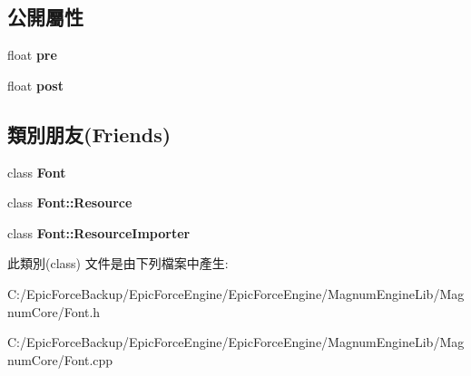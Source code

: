 \subsection*{公開屬性}
\begin{DoxyCompactItemize}
\item 
float {\bfseries pre}\hypertarget{class_magnum_1_1_font_1_1_quad_a71c6b4eb4f18a3c85398266227ae50bc}{}\label{class_magnum_1_1_font_1_1_quad_a71c6b4eb4f18a3c85398266227ae50bc}

\item 
float {\bfseries post}\hypertarget{class_magnum_1_1_font_1_1_quad_ab8ad6de2834a038e9e1c5c67e68adb4b}{}\label{class_magnum_1_1_font_1_1_quad_ab8ad6de2834a038e9e1c5c67e68adb4b}

\end{DoxyCompactItemize}
\subsection*{類別朋友(Friends)}
\begin{DoxyCompactItemize}
\item 
class {\bfseries Font}\hypertarget{class_magnum_1_1_font_1_1_quad_ad564b94b59dc295de3dfc4415d95cca8}{}\label{class_magnum_1_1_font_1_1_quad_ad564b94b59dc295de3dfc4415d95cca8}

\item 
class {\bfseries Font\+::\+Resource}\hypertarget{class_magnum_1_1_font_1_1_quad_aed1576435da2fd6be67b0972d456c130}{}\label{class_magnum_1_1_font_1_1_quad_aed1576435da2fd6be67b0972d456c130}

\item 
class {\bfseries Font\+::\+Resource\+Importer}\hypertarget{class_magnum_1_1_font_1_1_quad_adcf31f02b1c16e69102f4d80f9a06dfd}{}\label{class_magnum_1_1_font_1_1_quad_adcf31f02b1c16e69102f4d80f9a06dfd}

\end{DoxyCompactItemize}


此類別(class) 文件是由下列檔案中產生\+:\begin{DoxyCompactItemize}
\item 
C\+:/\+Epic\+Force\+Backup/\+Epic\+Force\+Engine/\+Epic\+Force\+Engine/\+Magnum\+Engine\+Lib/\+Magnum\+Core/Font.\+h\item 
C\+:/\+Epic\+Force\+Backup/\+Epic\+Force\+Engine/\+Epic\+Force\+Engine/\+Magnum\+Engine\+Lib/\+Magnum\+Core/Font.\+cpp\end{DoxyCompactItemize}
